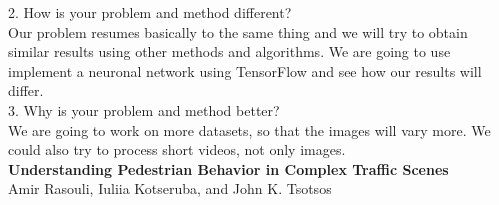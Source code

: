 \documentclass[runningheads,a4paper,11pt]{report}
\begin{document}
2. How is your problem and method different? \\ 
Our problem resumes basically to the same thing and we will try to obtain similar results using other methods and algorithms. We are going to use implement a neuronal network using TensorFlow and see how our results will differ. \\

3. Why is your problem and method better? \\
We are going to work on more datasets, so that the images will vary more. We could also try to process short videos, not only images. \\



\textbf{Understanding Pedestrian Behavior in Complex Traffic Scenes} \\
	Amir Rasouli, Iuliia Kotseruba, and John K. Tsotsos \\
\end{document}
